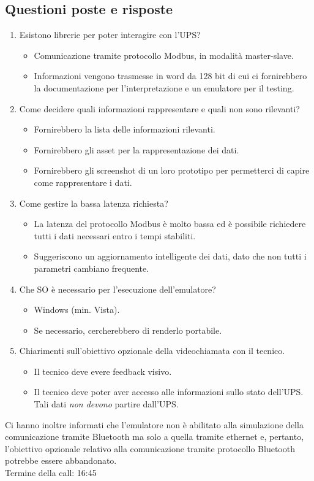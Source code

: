 \subsection{Questioni poste e risposte}
\begin{enumerate}
    \item Esistono librerie per poter interagire con l'UPS?
    \begin{itemize}
        \item Comunicazione tramite protocollo Modbus, in modalità master-slave.
        \item Informazioni vengono trasmesse in word da 128 bit di cui ci fornirebbero la documentazione per l'interpretazione e un emulatore per il testing.
    \end{itemize}
    \item Come decidere quali informazioni rappresentare e quali non sono rilevanti?
    \begin{itemize}
        \item Fornirebbero la lista delle informazioni rilevanti.
        \item Fornirebbero gli asset per la rappresentazione dei dati.
        \item Fornirebbero gli screenshot di un loro prototipo per permetterci di capire come rappresentare i dati.
    \end{itemize}
    \item Come gestire la bassa latenza richiesta?
    \begin{itemize}
        \item La latenza del protocollo Modbus è molto bassa ed è possibile richiedere tutti i dati necessari entro i tempi stabiliti.
        \item Suggeriscono un aggiornamento intelligente dei dati, dato che non tutti i parametri cambiano frequente.
    \end{itemize}
    \item Che SO è necessario per l'esecuzione dell'emulatore?
    \begin{itemize}
        \item Windows (min. Vista).
        \item Se necessario, cercherebbero di renderlo portabile.
    \end{itemize}
    \item Chiarimenti sull'obiettivo opzionale della videochiamata con il tecnico.
    \begin{itemize}
        \item Il tecnico deve evere feedback visivo.
        \item Il tecnico deve poter aver accesso alle informazioni sullo stato dell'UPS. Tali dati \emph{non devono} partire dall'UPS.
    \end{itemize}
\end{enumerate}
Ci hanno inoltre informati che l'emulatore non è abilitato alla simulazione della comunicazione tramite Bluetooth ma solo a quella tramite ethernet e, pertanto, l'obiettivo opzionale relativo alla comunicazione tramite protocollo Bluetooth potrebbe essere abbandonato.\\
Termine della call: 16:45

